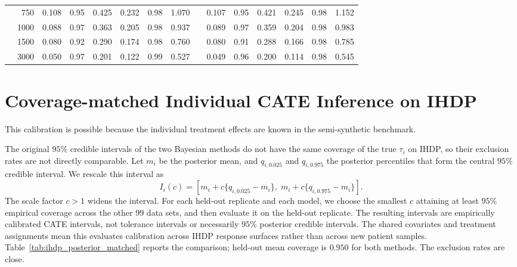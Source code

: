 \documentclass[12pt]{article}
\begin{document}
\begin{table}[htbp]
{\begin{tabular}{lr ccc ccc c ccc ccc}
& 750 & 0.108 & 0.95 & 0.425 & 0.232 & 0.98 & 1.070 &  & 0.107 & 0.95 & 0.421 & 0.245 & 0.98 & 1.152 \\
& 1000 & 0.088 & 0.97 & 0.363 & 0.205 & 0.98 & 0.937 &  & 0.089 & 0.97 & 0.359 & 0.204 & 0.98 & 0.983 \\
& 1500 & 0.080 & 0.92 & 0.290 & 0.174 & 0.98 & 0.760 &  & 0.080 & 0.91 & 0.288 & 0.166 & 0.98 & 0.785 \\
& 3000 & 0.050 & 0.97 & 0.201 & 0.122 & 0.99 & 0.527 &  & 0.049 & 0.96 & 0.200 & 0.114 & 0.98 & 0.545 \\
\bottomrule
\end{tabular}}
\end{table}

\section{Coverage-matched Individual CATE Inference on IHDP}
\label{subsec:ihdp_matched_supp}

This calibration is possible because the individual treatment effects are known in the semi-synthetic benchmark.

The original $95\%$ credible intervals of the two Bayesian methods do not have the same coverage of the true $\tau_i$ on IHDP, so their exclusion rates are not directly comparable. Let $m_i$ be the posterior mean, and $q_{i,0.025}$ and $q_{i,0.975}$ the posterior percentiles that form the central $95\%$ credible interval. We rescale this interval as
\[
 I_i(c)=\left[m_i+c\{q_{i,0.025}-m_i\},\;m_i+c\{q_{i,0.975}-m_i\}\right].
\]
The scale factor $c>1$ widens the interval. For each held-out replicate and each model, we choose the smallest $c$ attaining at least $95\%$ empirical coverage across the other 99 data sets, and then evaluate it on the held-out replicate. The resulting intervals are empirically calibrated CATE intervals, not tolerance intervals or necessarily $95\%$ posterior credible intervals. The shared covariates and treatment assignments mean this evaluates calibration across IHDP response surfaces rather than across new patient samples. Table~\ref{tab:ihdp_posterior_matched} reports the comparison; held-out mean coverage is $0.950$ for both methods. The exclusion rates are close.
\end{document}

